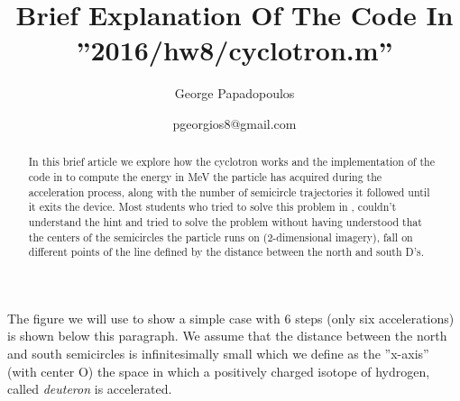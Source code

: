 \documentclass[10pt]{article}
\title{\textbf{Brief Explanation Of The Code In ''2016/hw8/cyclotron.m''}}
\author{George Papadopoulos}\date{pgeorgios8@gmail.com}
\newcommand{\matlab}{\text{\color{red}matlab }}
\begin{document}
\maketitle
\begin{abstract}
In this brief article we explore how the cyclotron works and the implementation of the 
code in \matlab  to compute the energy in MeV the particle has acquired during the 
acceleration process, along with the number of semicircle trajectories it followed until 
it exits the device. Most students who tried to solve this problem in \matlab, couldn't 
understand the hint and tried to solve the problem without having understood that the 
centers of the semicircles the particle runs on (2-dimensional imagery), fall on 
different points of the line defined by the distance between the north and south D's.
\end{abstract}
The figure we will use to show a simple case with 6 steps (only six accelerations) is 
shown below this paragraph. We assume that the distance between the north and south 
semicircles is infinitesimally small  which we define as the ''x-axis'' (with center O) 
the space in which a positively charged isotope of hydrogen, called \textit{deuteron} is 
accelerated.
\end{document}
